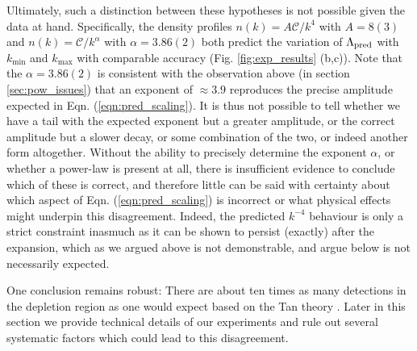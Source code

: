 	Ultimately,  such a distinction between these hypotheses is not possible given the data at hand. 
	Specifically, the density profiles $n(k)=A\mathcal{C}/k^4$ with $A=8(3)$ and $n(k)=\mathcal{C}/k^{\alpha}$ with $\alpha=3.86(2)$ both predict the variation of $\Lambda_{\rm pred}$ with $k_\textrm{min}$ and $k_\textrm{max}$ with comparable accuracy (Fig. \ref{fig:exp_results} (b,c)).
	Note that the $\alpha=3.86(2)$ is consistent with the observation above (in section \ref{sec:pow_issues}) that an exponent of $\approx3.9$ reproduces the precise amplitude expected in Eqn. (\ref{eqn:pred_scaling}).
	It is thus not possible to tell whether we have a tail with the expected exponent but a greater amplitude, or the correct amplitude but a slower decay, or some combination of the two, or indeed another form altogether.
	Without the ability to precisely determine the exponent $\alpha$, or whether a power-law is present at all, there is insufficient evidence to conclude which of these is correct, and therefore little can be said with certainty about which aspect of Eqn. (\ref{eqn:pred_scaling}) is incorrect or what physical effects might underpin this disagreement.
	Indeed, the predicted $k^{-4}$ behaviour is only a strict constraint inasmuch as it can be shown to persist (exactly) after the expansion, which as we argued above is not demonstrable, and argue below is not necessarily expected.
	
	
	One conclusion remains robust: There are  about ten times as many detections in the depletion region as one would expect based on the Tan theory . 
	Later in this section we provide technical details of our experiments and rule out several systematic factors which could lead to this disagreement.

